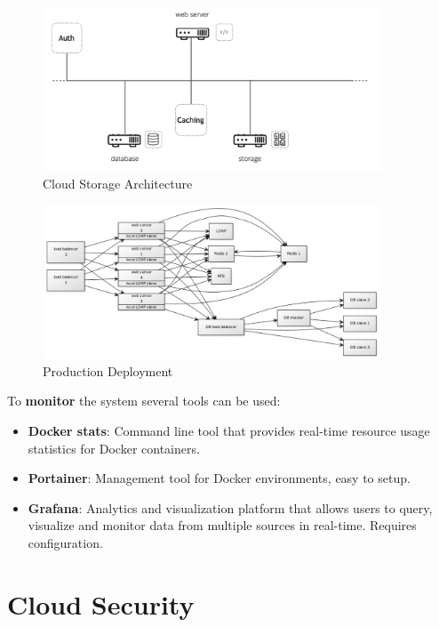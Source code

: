 \begin{figure}[H]
    \centering
    \includegraphics[width=0.9\textwidth]{assets/fig47.png}
    \caption{Cloud Storage Architecture}
\end{figure}

\begin{figure}[H]
    \centering
    \includegraphics[width=0.9\textwidth]{assets/fig48.png}
    \caption{Production Deployment}
\end{figure}

To \textbf{monitor} the system several tools can be used:
\begin{itemize}
    \item \textbf{Docker stats}: Command line tool that provides real-time resource usage statistics for Docker containers.
    \item \textbf{Portainer}: Management tool for Docker environments, easy to setup.
    \item \textbf{Grafana}: Analytics and visualization platform that allows users to query, visualize and monitor data from multiple sources in real-time. Requires configuration. 
\end{itemize}

\section{Cloud Security}

